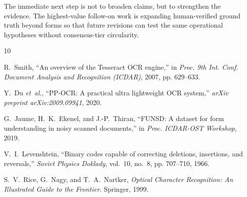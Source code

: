 \documentclass[conference]{IEEEtran}
\begin{document}
The immediate next step is not to broaden claims, but to strengthen the evidence. The highest-value follow-on work is expanding human-verified ground truth beyond forms so that future revisions can test the same operational hypotheses without consensus-tier circularity.


\begin{thebibliography}{10}

R.~Smith, ``An overview of the Tesseract OCR engine,'' in \textit{Proc. 9th Int. Conf. Document Analysis and Recognition (ICDAR)}, 2007, pp. 629--633.

Y.~Du \textit{et~al.}, ``PP-OCR: A practical ultra lightweight OCR system,'' \textit{arXiv preprint arXiv:2009.09941}, 2020.

G.~Jaume, H.~K.~Ekenel, and J.-P.~Thiran, ``FUNSD: A dataset for form understanding in noisy scanned documents,'' in \textit{Proc. ICDAR-OST Workshop}, 2019.

V.~I.~Levenshtein, ``Binary codes capable of correcting deletions, insertions, and reversals,'' \textit{Soviet Physics Doklady}, vol.~10, no.~8, pp. 707--710, 1966.

S.~V.~Rice, G.~Nagy, and T.~A.~Nartker, \textit{Optical Character Recognition: An Illustrated Guide to the Frontier}. Springer, 1999.

\end{thebibliography}
\end{document}
